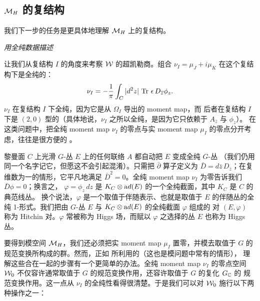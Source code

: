 
\subsection{$\MH$ 的复结构}

\label{sec:complexstr}

我们下一步的任务是更具体地理解 $\MH$ 上的复结构。

\par\medskip\emph{用全纯数据描述}

让我们从复结构 $I$ 的角度来考察 $\EUW$ 的超凯勒商。组合
$\nu_I=\mu_J+i\mu_K$ 在这个复结构下是全纯的：
\setcounter{equation}{19}
\begin{equation}\label{eq:uttup}
\nu_I=-{1\over \pi}\int_C|d^2z|\,\Tr\,\epsilon\,D_{\bar
z}\phi_z.
\end{equation}
 $\nu_I$ 在复结构 $I$ 下全纯，因为它是从 $\Omega_I$ 导出的 moment map，而
后者在复结构 $I$ 下是 $(2,0)$ 型的（具体地说，$\nu_I$ 之所以全纯，是因为它只依赖于 $A_{\bar z}$ 与 $\phi_z$）。
在这类问题中，把全纯 moment map $\nu_I$ 的零点与实 moment map $\mu_I$ 的零点分开考虑，往往是很方便的 \cite{ref61}。

黎曼面 $C$ 上光滑 $G$-丛 $E$ 上的任何联络 $A$ 都自动把 $E$ 变成全纯 $G$-丛
（我们仍用同一个名字记它，但愿这不会引起混淆）。只需把 $\bar\partial$ 算子定义为
$\bar D=d\bar z\,D_{\bar z}$；在复维数为一的情形，它平凡地满足 $\bar D^2=0$。全纯
moment map $\nu_I$ 为零告诉我们 $\bar D\phi=0$；换言之，
$\varphi=\phi_z\,dz$ 是 $K_C\otimes {\rm
ad}(E)$ 的一个全纯截面，其中 $K_C$ 是 $C$ 的典范线丛。
换个说法，$\varphi$ 是一个取值于伴随表示、也就是取值于 $E$ 的伴随丛的全纯
1-形式。我们把由 $G$-丛 $E$ 与 $K_C\otimes {\rm ad}(E)$ 的全纯截面 $\varphi$ 组成的
对 $(E,\varphi)$ 称为 Hitchin 对。$\varphi$ 常被称为 Higgs 场，而赋以 $\varphi$
之选择的丛 $E$ 也称为 Higgs 丛。

要得到模空间 $\MH$，我们还必须把实 moment map $\mu_I$ 置零，并模去取值于 $G$ 的
规范变换所构成的群。然而，正如 \cite{ref20} 所利用的（这也是模问题中常有的情形），
理解这些合在一起的步骤有一个更简单的办法。全纯 moment map $\nu_I$ 的零点空间 $\EUW_0$
不仅容许通常取值于 $G$ 的规范变换作用，还容许取值于 $G$ 的复化 $G_{\Bbb{C}}$ 的
规范变换作用。这一点从 $\nu_I$ 的全纯性看得很清楚。于是我们可以对 $\EUW_0$
施行以下两种操作之一：

